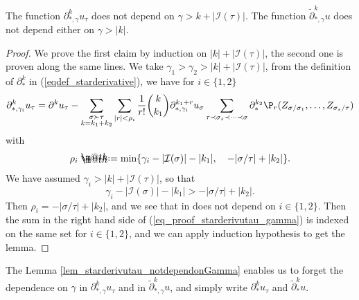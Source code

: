 \documentclass[11pt]{preprint}
\makeatletter
\newcommand{\mcI}{\mathcal{I}}
\def\eqref#1{(\ref{#1})}
\newcommand*{\defeq}{\mathrel{\rlap{%
			\raisebox{0.3ex}{$\m@th\cdot$}}%
		\raisebox{-0.3ex}{$\m@th\cdot$}}%
	=}
\makeatother
\begin{document}
	\begin{lemma}\label{lem_starderivutau_notdependonGamma}
		The function $\partial^k_{*,\gamma}u_\tau$ does not depend on $\gamma>k+|\mcI(\tau)|$. The function $\widetilde\partial^k_{*,\gamma}u$ does not depend either on $\gamma>|k|$.
	\end{lemma}
	\begin{proof}
		We prove the first claim by induction on $|k|+|\mcI(\tau)|$, the second one is proven along the same lines.
		We take $\gamma_1>\gamma_2>|k|+|\mcI(\tau)|$, from the definition of $\partial^k_*$ in \eqref{eqdef_starderivative}, we have for $i\in\{1,2\}$
		\begin{equation}\label{eq_proof_starderivutau_gamma}
			\partial^k_{*,\gamma_i} u_\tau  =  \partial^k u_\tau - \sum_{\substack{\sigma\succ\tau \\ k=k_1+k_2}} \sum_{|r|< \rho_i    } \frac{1}{r!}\binom{k}{k_1} \partial^{k_1+r}_{*,\gamma_i}u_\sigma \sum_{\tau\prec\sigma_s\prec \dots\prec\sigma} \partial^{k_2}_*\P_r(Z_{\sigma/\sigma_1},\dots, Z_{\sigma_s/\tau}      ) 
		\end{equation}
		with 
		$$
		\rho_i \defeq \min\{  \gamma_i - |\mcI(\sigma)| - |k_1| , \quad - |\sigma/\tau|+|k_2|      \}.
		$$
		We have assumed $\gamma_i>|k|+|\mcI(\tau)| $, so that 
		$$
		\gamma_i - |\mcI(\sigma)| - |k_1| > - |\sigma/\tau|+|k_2|.  
		$$
		Then $\rho_i=-|\sigma/\tau|+|k_2|$,  and we see that in does not depend on $i\in\{1,2\}$. Then the sum in the right hand side of \eqref{eq_proof_starderivutau_gamma} is indexed on the same set for $i\in\{1,2\}$, and we can apply induction hypothesis to get the lemma.
	\end{proof}
	
	
	The Lemma \ref{lem_starderivutau_notdependonGamma} enables us to forget the dependence on $\gamma$ in $\partial^k_{*,\gamma}u_\tau$ and in $\widetilde\partial^k_{*,\gamma}u$, and simply write $\partial^k_*u_\tau$ and $\widetilde\partial^k_{*}u$.
	
	
	
	
\end{document}
